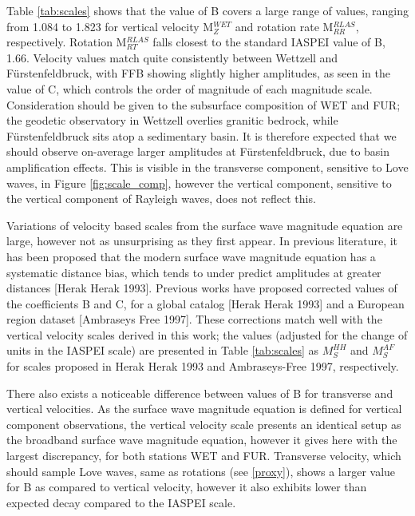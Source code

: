 \documentclass{gji}
\begin{document}
Table \ref{tab:scales} shows that the value of B covers a large range of values, ranging from 1.084 to 1.823 for vertical velocity M$^{WET}_{Z}$ and rotation rate M$^{RLAS}_{RR}$, respectively. Rotation M$^{RLAS}_{RT}$ falls closest to the standard IASPEI value of B, 1.66. Velocity values match quite consistently between Wettzell and F\"urstenfeldbruck, with FFB showing slightly higher amplitudes, as seen in the value of C, which controls the order of magnitude of each magnitude scale. Consideration should be given to the subsurface composition of WET and FUR; the geodetic observatory in Wettzell overlies granitic bedrock, while F\"urstenfeldbruck sits atop a sedimentary basin. It is therefore expected that we should observe on-average larger amplitudes at F\"urstenfeldbruck, due to basin amplification effects. This is visible in the transverse component, sensitive to Love waves, in Figure \ref{fig:scale_comp}, however the vertical component, sensitive to the vertical component of Rayleigh waves, does not reflect this. 

Variations of velocity based scales from the surface wave magnitude equation are large, however not as unsurprising as they first appear. In previous literature, it has been proposed that the modern surface wave magnitude equation has a systematic distance bias, which tends to under predict amplitudes at greater distances [Herak Herak 1993]. Previous works have proposed corrected values of the coefficients B and C, for a global catalog [Herak Herak 1993] and a European region dataset [Ambraseys Free 1997]. These corrections match well with the vertical velocity scales derived in this work; the values (adjusted for the change of units in the IASPEI scale) are presented in Table \ref{tab:scales} as $M_S^{HH}$ and $M_S^{AF}$ for scales proposed in Herak Herak 1993 and Ambraseys-Free 1997, respectively. 

There also exists a noticeable difference between values of B for transverse and vertical velocities. As the surface wave magnitude equation is defined for vertical component observations, the vertical velocity scale presents an identical setup as the broadband surface wave magnitude equation, however it gives here with the largest discrepancy, for both stations WET and FUR.  Transverse velocity, which should sample Love waves, same as rotations (see \ref{proxy}), shows a larger value for B as compared to vertical velocity, however it also exhibits lower than expected decay compared to the IASPEI scale. 
\end{document}
